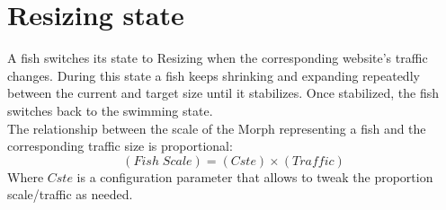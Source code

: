 \section{Resizing state}
A fish switches its state to Resizing when the corresponding website's traffic changes. During this state a fish keeps shrinking and expanding repeatedly between the current and target size until it stabilizes. Once stabilized, the fish switches back to the swimming state.\\

The relationship between the scale of the Morph representing a fish and the corresponding traffic size is proportional:
\[(Fish\; Scale) = (Cste) \times (Traffic)\]
Where $Cste$ is a configuration parameter that allows to tweak the proportion scale/traffic as needed.

\newpage